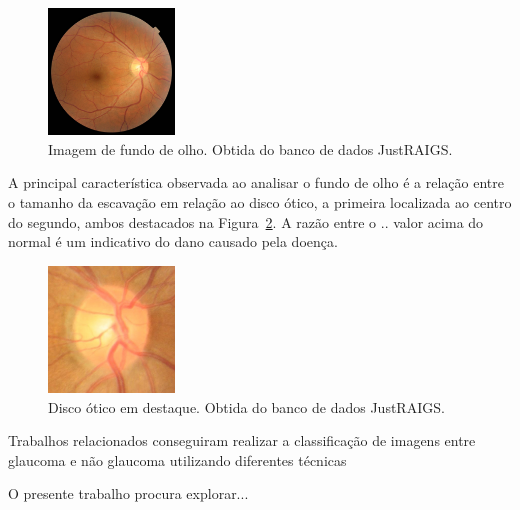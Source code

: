 \documentclass[12pt]{article}
\begin{document}
\begin{figure}[htb]
 \centering
 \includegraphics[width=0.3\textwidth]{images/TRAIN000004_cut.JPG}
 \caption{Imagem de fundo de olho. Obtida do banco de dados JustRAIGS.}
 \label{fig:fundus}
\end{figure}

A principal característica observada ao analisar o fundo de olho é a relação entre o tamanho da escavação em relação ao disco ótico, a primeira localizada ao centro do segundo, ambos destacados na Figura~\ref{fig:disk}. A razão entre o .. valor acima do normal é um indicativo do dano causado pela doença. 

\begin{figure}[htb]
 \centering
 \includegraphics[width=0.3\textwidth]{images/disk.jpg}
 \caption{Disco ótico em destaque. Obtida do banco de dados JustRAIGS.}
 \label{fig:disk}
\end{figure}


Trabalhos relacionados conseguiram realizar a classificação de imagens entre glaucoma e não glaucoma utilizando diferentes técnicas 

O presente trabalho procura explorar...
\end{document}

